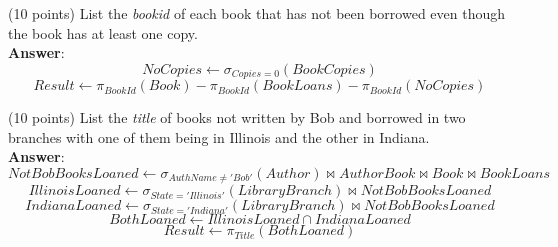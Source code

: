 \begin{questions}
\begin{choices}
   
	
	\choice(10 points) List the \textit{bookid} of each book that has not been borrowed even though the book has at least one copy. \\
    \textbf{Answer}:\\
     $$NoCopies \leftarrow \sigma_{Copies=0}(BookCopies)$$
     $$Result \leftarrow \pi_{BookId}(Book) - \pi_{BookId}(BookLoans) - \pi_{BookId}(NoCopies)$$
    
	
	\choice(10 points) List the \textit{title} of books not written by Bob and borrowed in two branches with one of them being in Illinois and the other in Indiana. \\
    \textbf{Answer}:\\
    $$NotBobBooksLoaned \leftarrow \sigma_{AuthName \neq 'Bob'}(Author) \bowtie AuthorBook \bowtie Book \bowtie BookLoans$$
	$$IllinoisLoaned \leftarrow \sigma_{State='Illinois'}(LibraryBranch) \bowtie NotBobBooksLoaned$$
	$$IndianaLoaned \leftarrow \sigma_{State='Indiana'}(LibraryBranch) \bowtie NotBobBooksLoaned$$
	$$BothLoaned \leftarrow IllinoisLoaned \cap IndianaLoaned$$
	$$Result \leftarrow \pi_{Title}(BothLoaned)$$
	
\end{choices}




\end{questions}
